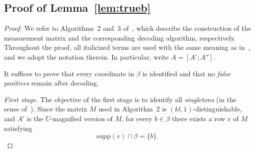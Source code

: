 \documentclass{article}
\newcommand{\xl}[1]{{\color{blue}#1}}
\newcommand{\supp}{\mathrm{supp}}
\newcommand{\sign}{\mathrm{sign}}
\begin{document}
\subsection{Proof of Lemma~\ref{lem:trueb}}
\begin{proof}





We refer to Algorithms~2 and~3 of~\cite{li2025support}, which describe the construction of the measurement matrix and the corresponding decoding algorithm, respectively. Throughout the proof, all italicized terms are used with the same meaning as in~\cite{li2025support}, and we adopt the notation therein. In particular, write $A=[A';A'']$.

It suffices to prove that every coordinate in $\beta$ is identified and that no \emph{false positives} remain after decoding.

\emph{First stage.}
The objective of the first stage is to identify all \emph{singletons} (in the sense of~\cite{li2025support}). Since the matrix $M$ used in Algorithm~2 is $(kl,1)$-distinguishable, and $A'$ is the $U$-magnified version of $M$, for every $b\in\beta$ there exists a row $v$ of $M$ satisfying
\[
\supp(v)\cap\beta=\{b\}.
\]


\end{proof}
\end{document}
